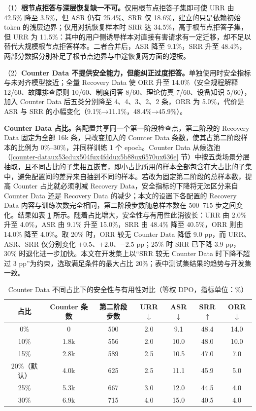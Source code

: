\documentclass[fontset=fandol,type=master,campus=shenzhen,etitleauto=true]{hithesisbook}
\begin{document}
（1）\textbf{根节点拒答与深层恢复缺一不可。}仅用根节点拒答子集即可使 URR 由 42.5\% 降至 3.5\%，但 ASR 仍有 25.4\%、SRR 仅 18.6\%，建立的只是依赖初始 token 的浅层边界；仅用对抗恢复样本时 SRR 达 34.5\%，高于根节点拒答子集，但 URR 为 11.5\%：其中的用户侧诱导样本对直接有害请求有一定迁移，却不足以替代大规模根节点拒答样本。二者合并后，ASR 降至 9.1\%，SRR 升至 48.4\%，两部分数据分别补足了根节点边界与中途恢复两方面的短板。

（2）\textbf{Counter Data 不提供安全能力，但能纠正过度拒答。}单独使用时安全指标与未对齐模型接近；全量 Recovery Data 使 ORR 升至 14.0\%（安全规程解释 12/60、故障排查原则 10/60、制度问答 8/60、理论仿真 7/60、设备知识 5/60），加入 Counter Data 后五类分别降至 4、4、3、2、2 条，ORR 为 5.0\%，代价是 ASR 与 SRR 的小幅变化（9.1\%→11.1\%，48.4\%→45.9\%）。

\textbf{Counter Data 占比。}\label{counter-data-ux6bd4ux4f8bux7684ux5f71ux54cdux5206ux6790}各配置共享同一个第一阶段检查点，第二阶段的 Recovery Data 固定为全部 16k 条，只改变加入的 Counter Data 条数，使其占第二阶段样本的比例为 0\%--30\%，并同样训练 1 个 epoch。Counter Data 从候选池（\ref{counter-dataux53cdux504fux4fddux5b88ux6570ux636e} 节）中按五类场景分层抽取，且不同占比的子集相互嵌套，即小占比所用的样本全部包含在大占比的子集中，避免配置间的差异来自抽到不同的样本。若改为固定第二阶段的总样本数，提高 Counter 占比就必须削减 Recovery Data，安全指标的下降将无法区分来自 Counter Data 还是 Recovery Data 的减少；本文的设置下各配置的 Recovery Data 内容与训练次数完全相同，第二阶段步数随总样本数在 500--715 步之间变化。结果如表 \ref{tab:counter-ratio} 所示。随着占比增大，安全性与有用性此消彼长：URR 由 2.0\% 升至 4.0\%，ASR 由 9.1\% 升至 15.0\%，SRR 由 48.4\% 降至 40.5\%，ORR 则由 14.0\% 降至 4.0\%。取 20\% 时，ORR 较无 Counter Data 降低 9.0 pp，而 URR、ASR、SRR 仅分别变化 $+0.5$、$+2.0$、$-2.5$ pp；25\% 时 SRR 已下降 3.9 pp，30\% 时退化进一步加快。本文在开发集上以“SRR 较无 Counter Data 时下降不超过 3 pp”为约束，选取满足条件的最大占比 20\%；表中测试集结果的趋势与开发集一致。

\begin{table}[htbp]
\centering
\caption{Counter Data 不同占比下的安全性与有用性对比（等权 DPO，指标单位：\%）}
\label{tab:counter-ratio}
\small
\renewcommand{\arraystretch}{1.1}
\begin{tabular}{c c c c c c c}
\toprule
\textbf{占比} & \textbf{Counter 条数} & \textbf{第二阶段步数} & \textbf{URR$\downarrow$} & \textbf{ASR$\downarrow$} & \textbf{SRR$\uparrow$} & \textbf{ORR$\downarrow$} \\
\midrule
0\% & 0 & 500 & 2.0 & 9.1 & 48.4 & 14.0 \\
10\% & 1.8k & 556 & 2.0 & 10.0 & 48.0 & 10.0 \\
15\% & 2.8k & 589 & 2.5 & 10.5 & 47.0 & 7.0 \\
20\%（默认） & 4.0k & 625 & 2.5 & 11.1 & 45.9 & 5.0 \\
25\% & 5.3k & 667 & 3.0 & 12.0 & 44.5 & 4.0 \\
30\% & 6.9k & 715 & 4.0 & 15.0 & 40.5 & 4.0 \\
\bottomrule
\end{tabular}
\end{table}
\end{document}
